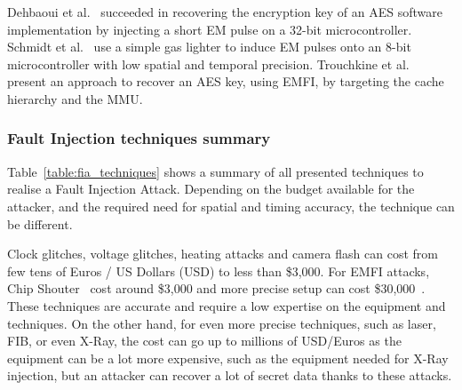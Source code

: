 Dehbaoui et al.~\cite{DMMDT-13-cosade} succeeded in recovering the encryption key of an AES software implementation by injecting a short EM pulse on a 32-bit microcontroller.
Schmidt et al.~\cite{SH-07-austrochip} use a simple gas lighter to induce EM pulses onto an 8-bit microcontroller with low spatial and temporal precision.
Trouchkine et al.~\cite{TBELB-21-jce} present an approach to recover an AES key, using EMFI, by targeting the cache hierarchy and the MMU.

\subsubsection{Fault Injection techniques summary}
Table~\ref{table:fia_techniques} shows a summary of all presented techniques to realise a Fault Injection Attack. Depending on the budget available for the attacker, and the required need for spatial and timing accuracy, the technique can be different.

Clock glitches, voltage glitches, heating attacks and camera flash can cost from few tens of Euros / US Dollars (USD) to less than \$3,000. For EMFI attacks, Chip Shouter~\cite{chipshouter} cost around \$3,000 and more precise setup can cost \$30,000~\cite{BH-22-access}. These techniques are accurate and require a low expertise on the equipment and techniques. On the other hand, for even more precise techniques, such as laser, FIB, or even X-Ray, the cost can go up to millions of USD/Euros as the equipment can be a lot more expensive, such as the equipment needed for X-Ray injection, but an attacker can recover a lot of secret data thanks to these attacks.

